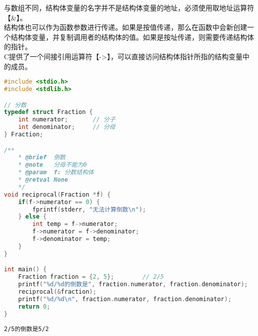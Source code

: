 与数组不同，结构体变量的名字并不是结构体变量的地址，必须使用取地址运算符【\&】。\\

结构体也可以作为函数参数进行传递。如果是按值传递，那么在函数中会新创建一个结构体变量，并复制调用者的结构体的值。如果是按址传递，则需要传递结构体的指针。\\

C提供了一个间接引用运算符【->】，可以直接访问结构体指针所指的结构变量中的成员。\\


\begin{lstlisting}[language=C]
#include <stdio.h>
#include <stdlib.h>

// 分数
typedef struct Fraction {
    int numerator;       // 分子
    int denominator;     // 分母
} Fraction;

/**
    * @brief  倒数
    * @note   分母不能为0
    * @param  f: 分数结构体
    * @retval None
    */
void reciprocal(Fraction *f) {
    if(f->numerator == 0) {
        fprintf(stderr, "无法计算倒数\n");
    } else {
        int temp = f->numerator;
        f->numerator = f->denominator;
        f->denominator = temp;
    }
}

int main() {
    Fraction fraction = {2, 5};        // 2/5
    printf("%d/%d的倒数是", fraction.numerator, fraction.denominator);
    reciprocal(&fraction);
    printf("%d/%d\n", fraction.numerator, fraction.denominator);
    return 0;
}
\end{lstlisting}

\begin{tcolorbox}
	\begin{verbatim}
2/5的倒数是5/2
	\end{verbatim}
\end{tcolorbox}